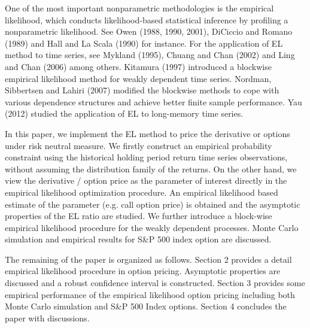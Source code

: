 One of the most important nonparametric methodologies is the empirical likelihood, which conducts likelihood-based statistical inference by profiling a nonparametric likelihood. See Owen (1988, 1990, 2001), DiCiccio and Romano (1989) and Hall and La Scala (1990) for instance. For the application of EL method to time series, see Mykland (1995), Chuang and Chan (2002) and Ling and Chan (2006) among others.  Kitamura (1997) introduced a blockwise empirical likelihood method for weakly dependent time series. Nordman, Sibbertsen and Lahiri (2007) modified the blockwise methods to cope with various dependence structures and achieve better finite sample performance. Yau (2012) studied the application of EL to long-memory time series. 

In this paper, we implement the EL method to price the derivative or options under risk neutral measure. We firstly construct an empirical probability constraint using the historical holding period return time series observations, without assuming the distribution family of the returns. On the other hand, we view the derivative / option price as the parameter of interest directly in the empirical likelihood optimization procedure. An empirical likelihood based estimate of the parameter (e.g. call option price) is obtained and the asymptotic properties of the EL ratio are studied. We further introduce a block-wise empirical likelihood procedure for the weakly dependent processes. Monte Carlo simulation and empirical results for S\&P 500 index option are discussed.     

The remaining of the paper is organized as follows. Section 2 provides a detail empirical likelihood procedure in option pricing. Asymptotic properties are discussed and a robust confidence interval is constructed. Section 3 provides some empirical performance of the empirical likelihood option pricing including both Monte Carlo simulation and S\&P 500 Index options. Section 4 concludes the paper with discussions.

 

